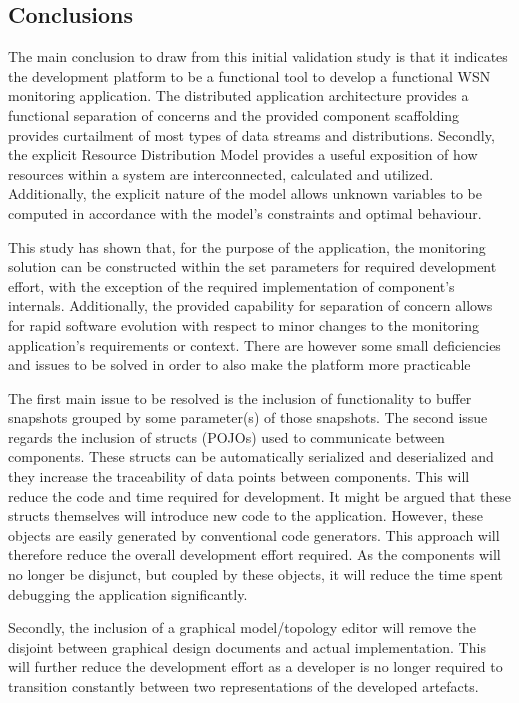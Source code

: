 \subsection{Conclusions}
The main conclusion to draw from this initial validation study is that it indicates the development platform to be a functional tool to develop a functional WSN monitoring application. The distributed application architecture provides a functional separation of concerns and the provided component scaffolding provides curtailment of most types of data streams and distributions. Secondly, the explicit Resource Distribution Model provides a useful exposition of how resources within a system are interconnected, calculated and utilized. Additionally, the explicit nature of the model allows unknown variables to be computed in accordance with the model's constraints and optimal behaviour.

This study has shown that, for the purpose of the \nedap\idsystems\sensit application, the monitoring solution can be constructed within the set parameters for required development effort, with the exception of the required implementation of component's internals. Additionally, the provided capability for separation of concern allows for rapid software evolution with respect to minor changes to the monitoring application's requirements or context. There are however some small deficiencies and issues to be solved in order to also make the platform more practicable

The first main issue to be resolved is the inclusion of functionality to buffer snapshots grouped by some parameter(s) of those snapshots. The second issue regards the inclusion of structs (POJOs) used to communicate between components. These structs can be automatically serialized and deserialized and they increase the traceability of data points between components. This will reduce the code and time required for development. It might be argued that these structs themselves will introduce new code to the application. However, these objects are easily generated by conventional code generators. This approach will therefore reduce the overall development effort required. As the components will no longer be disjunct, but coupled by these objects, it will reduce the time spent debugging the application significantly.

Secondly, the inclusion of a graphical model/topology editor will remove the disjoint between graphical design documents and actual implementation. This will further reduce the development effort as a developer is no longer required to transition constantly between two representations of the developed artefacts.

